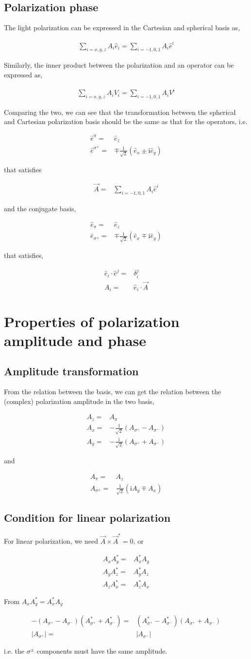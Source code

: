 \documentclass[10pt,fleqn]{article}
\newcommand{\ui}{\mathrm{i}}
\newcommand{\eqar}[1]
{
  \begin{align}
    #1
  \end{align}
}
\newcommand{\paren}[1]{{\left({#1}\right)}}
\newcommand{\abs}[1]{{\left|{#1}\right|}}
\begin{document}
\subsection{Polarization phase}
The light polarization can be expressed in the Cartesian and spherical basis as,
\eqar{
  \sum_{i=x,y,z}\!A_i\hat e_i=\sum_{i=-1,0,1}\!A_i\hat e^i
}
Similarly, the inner product between the polarization and an operator
can be expressed as,
\eqar{
  \sum_{i=x,y,z}\!A_i V_i=\sum_{i=-1,0,1}\!A_i V^i
}
Comparing the two, we can see that the transformation between the spherical
and Cartesian polarization basis should be the same as that for the operators, i.e.
{
  \color{red}
  \eqar{
    \hat e^\pi=&\hat e_z\\
    \hat e^{\sigma^\pm}=&\mp\frac{1}{\sqrt{2}}\paren{\hat e_x\pm\ui\hat e_y}
  }
  that satisfies
  \eqar{
    \vec A=&\sum_{i=-1,0,1}\!A_i\hat e^i
  }
}
and the conjugate basis,
{
  \color{blue}
  \eqar{
    \hat e_\pi=&\hat e_z\\
    \hat e_{\sigma^\pm}=&\mp\frac{1}{\sqrt{2}}\paren{\hat e_x\mp\ui\hat e_y}
  }
  that satisfies,
  \eqar{
    \hat e_i\cdot\hat e^j=&\delta_i^j\\
    A_i=&\hat e_i\cdot\vec A
  }
}
\section{Properties of polarization amplitude and phase}
\subsection{Amplitude transformation}
From the relation between the basis, we can get the relation between
the (complex) polarization amplitude in the two basis,
{
  \color{red}
  \eqar{
    A_z=&A_\pi\\
    A_x=&-\frac{1}{\sqrt{2}}\paren{A_{\sigma^+}-A_{\sigma^-}}\\
    A_y=&-\frac{\ui}{\sqrt{2}}\paren{A_{\sigma^+}+A_{\sigma^-}}
  }
}
and
{
  \color{red}
  \eqar{
    A_\pi=&A_z\\
    A_{\sigma^\pm}=&\frac{1}{\sqrt{2}}\paren{\ui A_y\mp A_x}
  }
}
\subsection{Condition for linear polarization}
For linear polarization, we need $\vec A\times\vec A^*=0$, or
\eqar{
  A_xA_y^*=&A_x^*A_y\\
  A_yA_z^*=&A_y^*A_z\\
  A_zA_x^*=&A_z^*A_x
}
From $A_xA_y^*=A_x^*A_y$
\eqar{
  -\paren{A_{\sigma^+}-A_{\sigma^-}}\paren{A_{\sigma^+}^*+A_{\sigma^-}^*}=&\paren{A_{\sigma^+}^*-A_{\sigma^-}^*}\paren{A_{\sigma^+}+A_{\sigma^-}}\\
  \abs{A_{\sigma^+}}=&\abs{A_{\sigma^-}}
}
i.e. the $\sigma^\pm$ components must have the same amplitude.\\
\end{document}
